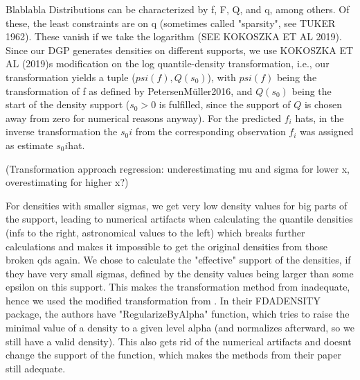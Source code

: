 Blablabla
Distributions can be characterized by f, F, Q, and q, among others. Of these, the least 
constraints are on q (sometimes called "sparsity", see TUKER 1962). These vanish if we
take the logarithm (SEE KOKOSZKA ET AL 2019). Since our DGP generates densities on
different supports, we use KOKOSZKA ET AL (2019)s modification on the log quantile-density
transformation, i.e., our transformation yields a tuple ($psi(f), Q(s_0)$), with
$psi(f)$ being the transformation of f as defined by {PetersenMüller2016}, and
$Q(s_0)$ being the start of the density support ($s_0 > 0$ is fulfilled, since the support
of $Q$ is chosen away from zero for numerical reasons anyway). For the predicted $f_i$ hats,
in the inverse transformation the $s_0i$ from the corresponding observation $f_i$ was
assigned as estimate $s_0i$hat.

(Transformation approach regression: underestimating mu and sigma for lower x,
overestimating for higher x?) \citet{PetersenLiuDivani2021}

For densities with smaller sigmas, we get very low density values for big parts of the
support, leading to numerical artifacts when calculating the quantile densities (infs
to the right, astronomical values to the left) which breaks further calculations and
makes it impossible to get the original densities from those broken qds again. We chose
to calculate the "effective" support of the densities, if they have very small sigmas,
defined by the density values being larger than some epsilon on this support. This
makes the transformation method from \citet{PetersenMüller2016} inadequate, hence we 
used the modified transformation from \citet{KokoszkaEtAl2019}. In their FDADENSITY
package, the authors have "RegularizeByAlpha" function, which tries to raise the minimal
value of a density to a given level alpha (and normalizes afterward, so we still have a 
valid density). This also gets rid of the numerical artifacts and doesnt change the 
support of the function, which makes the methods from their paper still adequate.